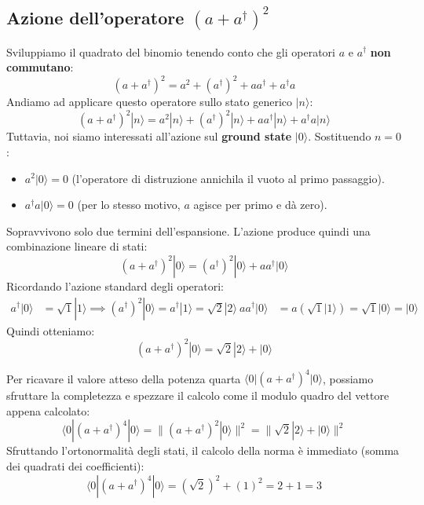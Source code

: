 \subsection{Azione dell'operatore $(a + a^\dagger)^2$}
Sviluppiamo il quadrato del binomio tenendo conto che gli operatori $a$ e $a^\dagger$ \textbf{non commutano}:
\begin{equation}
(a + a^\dagger)^2 = a^2 + (a^\dagger)^2 + a a^\dagger + a^\dagger a
\end{equation}
Andiamo ad applicare questo operatore sullo stato generico $\vert{}n\rangle$:
\begin{equation}
(a + a^\dagger)^2 |n\rangle = a^2 |n\rangle + (a^\dagger)^2 |n\rangle + a a^\dagger |n\rangle + a^\dagger a |n\rangle
\end{equation}
Tuttavia, noi siamo interessati all'azione sul \textbf{ground state} $\vert{}0\rangle$. Sostituendo $n=0$:
\begin{itemize}
\item $a^2 \vert{}0\rangle = 0$ (l'operatore di distruzione annichila il vuoto al primo passaggio).
\item $a^\dagger a \vert{}0\rangle = 0$ (per lo stesso motivo, $a$ agisce per primo e dà zero).
\end{itemize}
Sopravvivono solo due termini dell'espansione. L'azione produce quindi una combinazione lineare di stati:
\begin{equation}
(a + a^\dagger)^2 |0\rangle = (a^\dagger)^2 |0\rangle + a a^\dagger |0\rangle
\end{equation}
Ricordando l'azione standard degli operatori:
\begin{align}
a^\dagger |0\rangle &= \sqrt{1} |1\rangle \implies (a^\dagger)^2 |0\rangle = a^\dagger |1\rangle = \sqrt{2} |2\rangle \
a a^\dagger |0\rangle &= a \left( \sqrt{1} |1\rangle \right) = \sqrt{1} |0\rangle = |0\rangle
\end{align}
Quindi otteniamo:
\begin{equation}
(a + a^\dagger)^2 |0\rangle = \sqrt{2}|2\rangle + |0\rangle
\end{equation}

Per ricavare il valore atteso della potenza quarta $\langle 0 \vert{} (a + a^\dagger)^4 \vert{} 0 \rangle$, possiamo sfruttare la completezza e spezzare il calcolo come il modulo quadro del vettore appena calcolato:
\begin{equation}
\langle 0 | (a + a^\dagger)^4 | 0 \rangle = \Big\lVert (a + a^\dagger)^2 |0\rangle \Big\rVert^2 = \Big\lVert \sqrt{2}|2\rangle + |0\rangle \Big\rVert^2
\end{equation}
Sfruttando l'ortonormalità degli stati, il calcolo della norma è immediato (somma dei quadrati dei coefficienti):
\begin{equation}
\langle 0 | (a + a^\dagger)^4 | 0 \rangle = (\sqrt{2})^2 + (1)^2 = 2 + 1 = 3
\end{equation}


